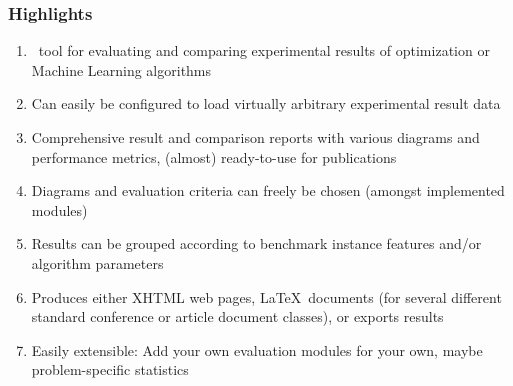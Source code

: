 %
%
%
%
\begin{frame}%
\frametitle{Highlights}%
\begin{enumerate}%
\item \optimizationBenchmarking\ tool for evaluating and comparing experimental results of optimization or Machine Learning algorithms%
\item<2-> Can easily be configured to load virtually arbitrary experimental result data%
\item<3-> Comprehensive result and comparison reports with various diagrams and performance metrics, (almost) ready-to-use for publications%
\item<4-> Diagrams and evaluation criteria can freely be chosen (amongst implemented modules)%
\item<5-> Results can be grouped according to benchmark instance features and/or algorithm parameters%
\item<6-> Produces either XHTML web pages, \LaTeX\ documents (for several different standard conference or article document classes), or exports results%
\item<7-> Easily extensible: Add your own evaluation modules for your own, maybe problem-specific statistics%
\end{enumerate}%
\end{frame}%
%